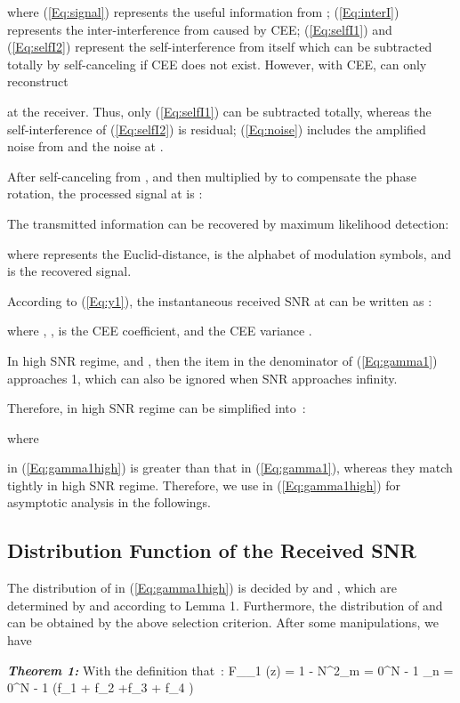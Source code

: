 \documentclass[onecolumn,letterpaper,11pt,draftclsnofoot]{IEEEtran}
\begin{document}
where (\ref{Eq:signal}) represents the useful information from
; (\ref{Eq:interI}) represents the inter-interference from
 caused by CEE; (\ref{Eq:selfI1}) and (\ref{Eq:selfI2})
represent the self-interference from  itself which can be
subtracted totally by self-canceling if CEE does not
exist\cite{Song2011}. However, with CEE,  can only reconstruct

at the receiver. Thus, only (\ref{Eq:selfI1}) can be subtracted
totally, whereas the self-interference of (\ref{Eq:selfI2}) is
residual; (\ref{Eq:noise}) includes the amplified noise from 
and the noise at .

After self-canceling  from , and then multiplied by
 to compensate the phase rotation,
the processed signal  at  is :


The transmitted information  can be recovered by maximum
likelihood detection:

where  represents the Euclid-distance,
 is the alphabet of modulation symbols, and  is the recovered signal.

According to (\ref{Eq:y1}), the instantaneous received SNR
 at  can be written as :

where , ,  is
the CEE coefficient, and the CEE variance .

In high SNR regime,  and
, then the item  in the denominator of
(\ref{Eq:gamma1}) approaches 1, which can also be ignored when SNR
approaches infinity\cite{Song2011}.

Therefore,  in high SNR regime can be simplified into~:

 where


 in (\ref{Eq:gamma1high}) is greater than that in
(\ref{Eq:gamma1}), whereas they match tightly in high SNR regime.
Therefore, we use  in (\ref{Eq:gamma1high}) for asymptotic
analysis in the followings.

\subsection{Distribution Function of the Received SNR}

The distribution of  in (\ref{Eq:gamma1high}) is decided
by  and , which are
determined by 
and  according
to Lemma 1. Furthermore, the distribution of 
and  can be obtained by the above selection
criterion. After some manipulations, we have


\textbf{\emph{Theorem 1:}} With the definition that~:
\label{Eq:cdf}
F_{\gamma _1 } \left(z\right) = 1 - N^2\sum\limits_{m = 0}^{N - 1}
{\sum\limits_{n = 0}^{N - 1} } 
\left(f_1 + f_2 +f_3 + f_4 \right) ~
\end{document}
